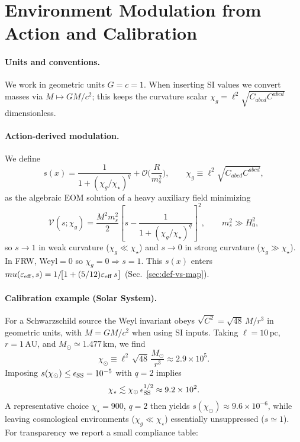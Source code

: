 \documentclass[aps,prd,onecolumn,superscriptaddress,nofootinbib]{revtex4-2}
\def\mu{mu}%
\providecommand{\be}{\begin{equation}}
\providecommand{\ee}{\end{equation}}
\begin{document}
\section{Environment Modulation from Action and Calibration}
\label{sec:env}

\paragraph{Units and conventions.}
We work in geometric units \(G=c=1\). When inserting SI values we convert masses via \(M\mapsto GM/c^2\); this keeps the curvature scalar \(\chi_g=\ell^2\sqrt{C_{abcd}C^{abcd}}\) dimensionless.

\paragraph{Action-derived modulation.}
We define
\be
s(x)=\frac{1}{1+(\chi_g/\chi_\star)^q}+\mathcal O\!\Big(\frac{R}{m_s^2}\Big),\qquad \chi_g\equiv \ell^2\sqrt{C_{abcd}C^{abcd}},
\ee
as the algebraic EOM solution of a heavy auxiliary field minimizing
\be
\mathcal V(s;\chi_g)=\frac{M^2 m_s^2}{2}\left[s-\frac{1}{1+(\chi_g/\chi_\star)^q}\right]^2,\qquad m_s^2\gg H_0^2,
\ee
so \(s\!\to\!1\) in weak curvature (\(\chi_g\!\ll\!\chi_\star\)) and \(s\!\to\!0\) in strong curvature (\(\chi_g\!\gg\!\chi_\star\)). In FRW, Weyl\(=0\) so \(\chi_g=0\Rightarrow s=1\).
This \(s(x)\) enters \(\mu(\varepsilon_{\rm eff},s)=1/\!\big[1+(5/12)\varepsilon_{\rm eff}\,s\big]\) (Sec.~\ref{sec:def-vs-map}).

\paragraph{Calibration example (Solar System).}
For a Schwarzschild source the Weyl invariant obeys \(\sqrt{C^2}=\sqrt{48}\,M/r^3\) in geometric units, with \(M=GM/c^2\) when using SI inputs. Taking \(\ell=10\,\mathrm{pc}\), \(r=1\,\mathrm{AU}\), and \(M_\odot\simeq 1.477\,\mathrm{km}\), we find
\[
\chi_\odot \equiv \ell^2 \, \sqrt{48}\,\frac{M_\odot}{r^3} \approx 2.9\times 10^{5}.
\]
Imposing \(s(\chi_\odot)\le \epsilon_{\rm SS}=10^{-5}\) with \(q=2\) implies
\[
\chi_\star \lesssim \chi_\odot\,\epsilon_{\rm SS}^{1/2} \approx 9.2\times 10^{2}.
\]
A representative choice \(\chi_\star=900\), \(q=2\) then yields \(s(\chi_\odot)\approx 9.6\times 10^{-6}\), while leaving cosmological environments (\(\chi_g\ll\chi_\star\)) essentially unsuppressed (\(s\simeq 1\)). For transparency we report a small compliance table:
\end{document}
